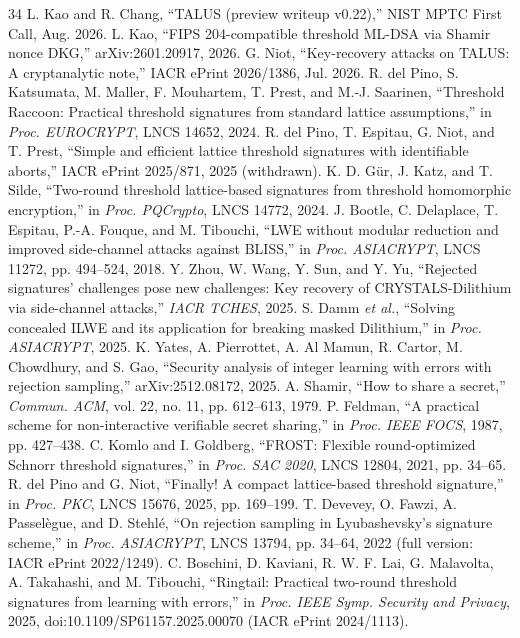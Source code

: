 \documentclass[10pt,conference,a4paper]{IEEEtran}
\begin{document}
\begin{thebibliography}{34}
 L. Kao and R. Chang, ``TALUS (preview writeup v0.22),'' NIST MPTC First Call, Aug. 2026.
 L. Kao, ``FIPS 204-compatible threshold ML-DSA via Shamir nonce DKG,'' arXiv:2601.20917, 2026.
 G. Niot, ``Key-recovery attacks on TALUS: A cryptanalytic note,'' IACR ePrint 2026/1386, Jul. 2026.
 R. del Pino, S. Katsumata, M. Maller, F. Mouhartem, T. Prest, and M.-J. Saarinen, ``Threshold Raccoon: Practical threshold signatures from standard lattice assumptions,'' in \emph{Proc. EUROCRYPT}, LNCS 14652, 2024.
 R. del Pino, T. Espitau, G. Niot, and T. Prest, ``Simple and efficient lattice threshold signatures with identifiable aborts,'' IACR ePrint 2025/871, 2025 (withdrawn).
 K. D. G\"ur, J. Katz, and T. Silde, ``Two-round threshold lattice-based signatures from threshold homomorphic encryption,'' in \emph{Proc. PQCrypto}, LNCS 14772, 2024.
 J. Bootle, C. Delaplace, T. Espitau, P.-A. Fouque, and M. Tibouchi, ``LWE without modular reduction and improved side-channel attacks against BLISS,'' in \emph{Proc. ASIACRYPT}, LNCS 11272, pp. 494--524, 2018.
 Y. Zhou, W. Wang, Y. Sun, and Y. Yu, ``Rejected signatures' challenges pose new challenges: Key recovery of CRYSTALS-Dilithium via side-channel attacks,'' \emph{IACR TCHES}, 2025.
 S. Damm \emph{et al.}, ``Solving concealed ILWE and its application for breaking masked Dilithium,'' in \emph{Proc. ASIACRYPT}, 2025.
 K. Yates, A. Pierrottet, A. Al Mamun, R. Cartor, M. Chowdhury, and S. Gao, ``Security analysis of integer learning with errors with rejection sampling,'' arXiv:2512.08172, 2025.
 A. Shamir, ``How to share a secret,'' \emph{Commun. ACM}, vol. 22, no. 11, pp. 612--613, 1979.
 P. Feldman, ``A practical scheme for non-interactive verifiable secret sharing,'' in \emph{Proc. IEEE FOCS}, 1987, pp. 427--438.
 C. Komlo and I. Goldberg, ``FROST: Flexible round-optimized Schnorr threshold signatures,'' in \emph{Proc. SAC 2020}, LNCS 12804, 2021, pp. 34--65.
 R. del Pino and G. Niot, ``Finally! A compact lattice-based threshold signature,'' in \emph{Proc. PKC}, LNCS 15676, 2025, pp. 169--199.
 T. Devevey, O. Fawzi, A. Passel\`egue, and D. Stehl\'e, ``On rejection sampling in Lyubashevsky's signature scheme,'' in \emph{Proc. ASIACRYPT}, LNCS 13794, pp. 34--64, 2022 (full version: IACR ePrint 2022/1249).
 C. Boschini, D. Kaviani, R. W. F. Lai, G. Malavolta, A. Takahashi, and M. Tibouchi, ``Ringtail: Practical two-round threshold signatures from learning with errors,'' in \emph{Proc. IEEE Symp. Security and Privacy}, 2025, doi:10.1109/SP61157.2025.00070 (IACR ePrint 2024/1113).

\end{thebibliography}
\end{document}
